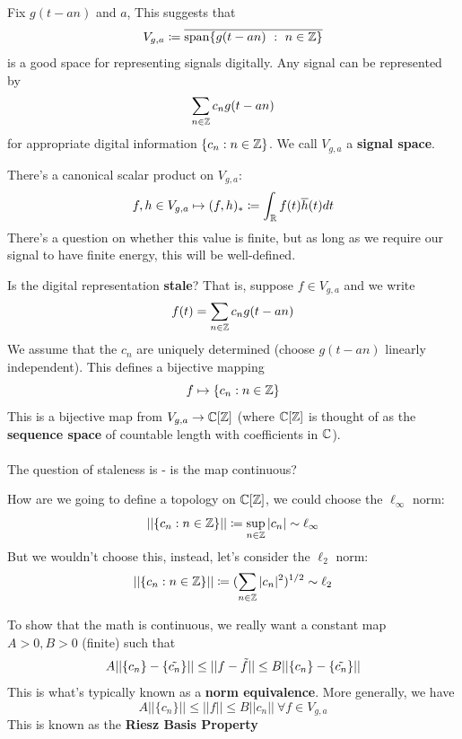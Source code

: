 \documentclass{article}
\begin{document}
\begin{definition}
    Fix $g(t - an)$ and $a$, This suggests that
    \[V_{g, a} \coloneqq \overline{\operatorname{span} \{g(t - an)\ :\ n \in \mathbb{Z}\}}\]
    is a good space for representing signals digitally. Any signal can be represented by
    \[\sum_{n \in \mathbb{Z}} c_n g(t - an)\]
    for appropriate digital information $\{c_n: n \in \mathbb{Z}\}$. We call $V_{g, a}$ a \textbf{signal space}.
\end{definition}

\begin{definition}
There's a canonical scalar product on $V_{g, a}$:    
\[f, h \in V_{g, a} \mapsto (f, h)_* \coloneqq \int_{\mathbb{R}} f(t) \overline{h}(t) dt\]
There's a question on whether this value is finite, but as long as we require our signal to have finite energy, this will be well-defined.
\end{definition}

\begin{question}
    Is the digital representation \textbf{stale}? That is, suppose $f \in V_{g, a}$ and we write
    \[f(t) = \sum_{n \in \mathbb{Z}} c_n g(t - an)\]
    We assume that the $c_n$ are uniquely determined (choose $g(t - an)$ linearly independent). This defines a bijective mapping
    \[f \mapsto \{c_n: n \in \mathbb{Z}\}\]
    This is a bijective map from $V_{g, a} \to \mathbb{C}[\mathbb{Z}]$ (where $\mathbb{C}[\mathbb{Z}]$ is thought of as the \textbf{sequence space} of countable length with coefficients in $\mathbb{C}$).\\\\
    The question of staleness is - is the map continuous?
\end{question}

How are we going to define a topology on $\mathbb{C}[\mathbb{Z}]$, we could choose the $\ell_\infty$ norm:
\[||\{c_n: n \in \mathbb{Z}\}|| \coloneqq \sup_{n \in \mathbb{Z}} |c_n| \sim \ell_\infty\]
But we wouldn't choose this, instead, let's consider the $\ell_2$ norm:
\[||\{c_n: n \in \mathbb{Z}\}|| \coloneqq (\sum_{n \in \mathbb{Z}} |c_n|^2)^{1/2} \sim \ell_2\]

To show that the math is continuous, we really want a constant map $A > 0, B > 0$ (finite) such that 
\[A ||\{c_n\} - \{\Tilde{c_n}\}|| \leq ||f - \Tilde{f}|| \leq B ||\{c_n\} - \{\Tilde{c_n}\}||\]
This is what's typically known as a \textbf{norm equivalence}. More generally, we have
\[A ||\{c_n\}|| \leq ||f|| \leq B||c_n||\ \forall f \in V_{g, a}\]
This is known as the \textbf{Riesz Basis Property}
\end{document}
